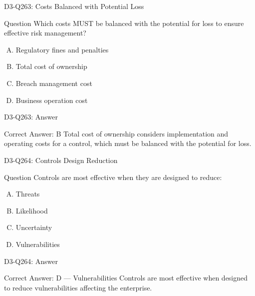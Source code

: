 \documentclass{beamer}
\begin{document}
	\begin{frame}{D3-Q263: Costs Balanced with Potential Loss}
		\begin{block}{Question}
			Which costs MUST be balanced with the potential for loss to ensure effective risk management?
		\end{block}
		\begin{enumerate}[(A)]
			\item Regulatory fines and penalties
			\item Total cost of ownership
			\item Breach management cost
			\item Business operation cost
		\end{enumerate}
	\end{frame}
	\begin{frame}{D3-Q263: Answer}
		\begin{block}{Correct Answer: B}
			Total cost of ownership considers implementation and operating costs for a control, which must be balanced with the potential for loss.
		\end{block}
	\end{frame}
	
	\begin{frame}{D3-Q264: Controls Design Reduction}
		\begin{block}{Question}
			Controls are most effective when they are designed to reduce:
		\end{block}
		\begin{enumerate}[(A)]
			\item Threats
			\item Likelihood
			\item Uncertainty
			\item Vulnerabilities
		\end{enumerate}
	\end{frame}
	\begin{frame}{D3-Q264: Answer}
		\begin{block}{Correct Answer: D --- Vulnerabilities}
			Controls are most effective when designed to reduce vulnerabilities affecting the enterprise.
		\end{block}
	\end{frame}
	
\end{document}

